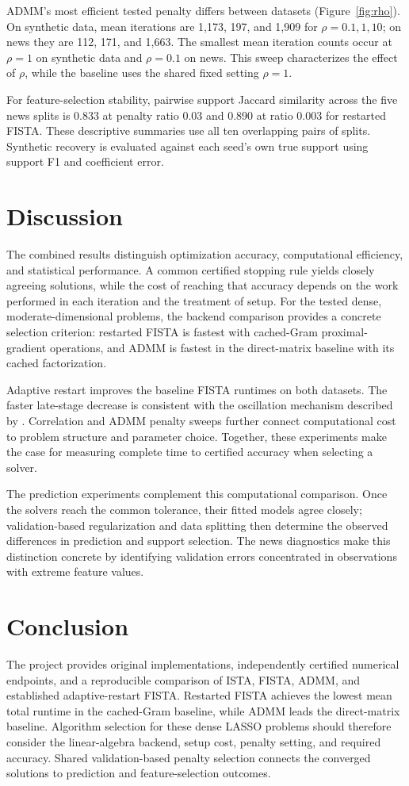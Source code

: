 \documentclass{article}
\begin{document}
ADMM's most efficient tested penalty differs between datasets (Figure~\ref{fig:rho}). On synthetic data, mean iterations are 1,173, 197, and 1,909 for $\rho=0.1,1,10$; on news they are 112, 171, and 1,663. The smallest mean iteration counts occur at $\rho=1$ on synthetic data and $\rho=0.1$ on news. This sweep characterizes the effect of $\rho$, while the baseline uses the shared fixed setting $\rho=1$.

For feature-selection stability, pairwise support Jaccard similarity across the five news splits is 0.833 at penalty ratio 0.03 and 0.890 at ratio 0.003 for restarted FISTA. These descriptive summaries use all ten overlapping pairs of splits. Synthetic recovery is evaluated against each seed's own true support using support F1 and coefficient error.

\section{Discussion}
The combined results distinguish optimization accuracy, computational efficiency, and statistical performance. A common certified stopping rule yields closely agreeing solutions, while the cost of reaching that accuracy depends on the work performed in each iteration and the treatment of setup. For the tested dense, moderate-dimensional problems, the backend comparison provides a concrete selection criterion: restarted FISTA is fastest with cached-Gram proximal-gradient operations, and ADMM is fastest in the direct-matrix baseline with its cached factorization.

Adaptive restart improves the baseline FISTA runtimes on both datasets. The faster late-stage decrease is consistent with the oscillation mechanism described by \citet{odonoghue2015}. Correlation and ADMM penalty sweeps further connect computational cost to problem structure and parameter choice. Together, these experiments make the case for measuring complete time to certified accuracy when selecting a solver.

The prediction experiments complement this computational comparison. Once the solvers reach the common tolerance, their fitted models agree closely; validation-based regularization and data splitting then determine the observed differences in prediction and support selection. The news diagnostics make this distinction concrete by identifying validation errors concentrated in observations with extreme feature values.

\newpage
\section{Conclusion}
The project provides original implementations, independently certified numerical endpoints, and a reproducible comparison of ISTA, FISTA, ADMM, and established adaptive-restart FISTA. Restarted FISTA achieves the lowest mean total runtime in the cached-Gram baseline, while ADMM leads the direct-matrix baseline. Algorithm selection for these dense LASSO problems should therefore consider the linear-algebra backend, setup cost, penalty setting, and required accuracy. Shared validation-based penalty selection connects the converged solutions to prediction and feature-selection outcomes.
\end{document}

